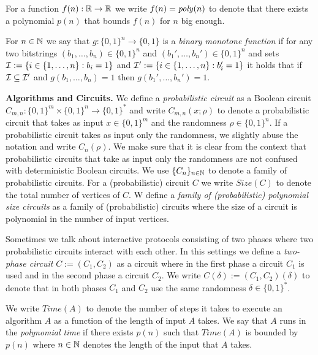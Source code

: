 For a function $f(n): \mathbb{R} \rightarrow \mathbb{R}$ we write $f(n) = \operatorname{\mathit{poly}}(n)$ to denote that there exists a polynomial $p(n)$ that
bounds $f(n)$ for $n$ big enough.

\begin{definition}
For $n \in \mathbb{N}$ we say that $g: \{0,1\}^n \rightarrow \{0,1\}$ is a \textit{binary monotone function}
if for any two bitstrings $(b_1, \dotsc, b_n) \in \{0,1\}^{n}$ and $(b_1', \dotsc, b_n') \in \{0,1\}^{n}$
and sets $\mathcal{I} := \{i \in \{1,\dotsc, n\}: b_i = 1\}$ and $\mathcal{I}' := \{i \in \{1,\dotsc, n\} : b_i' = 1\}$ it holds
that if $\mathcal{I} \subseteq \mathcal{I}'$ and $g(b_1, \dotsc, b_n) = 1$ then $g(b_1', \dotsc, b_n') = 1$.
\end{definition}

\textbf{Algorithms and Circuits.}
We define a \textit{probabilistic circuit} as a Boolean circuit $C_{m,n} : \{0,1\}^{m} \times \{0,1\}^{n} \rightarrow \{0,1\}^{*}$ and
write $C_{m,n}(x;\rho)$ to denote a probabilistic circuit that takes as input $x \in \{0,1\}^{m}$ and the randomness $\rho \in \{0,1\}^{n}$.
If a probabilistic circuit takes as input only the randomness, we slightly abuse the notation and write $C_{n}(\rho)$.
We make sure that it is clear from the context that probabilistic circuits that take as input only the randomness
are not confused with deterministic Boolean circuits. We use $\{C_n\}_{n \in \mathbb{N}}$ to denote a family of probabilistic circuits.
For a (probabilistic) circuit $C$ we write $\mathit{Size}(C)$ to denote the total number of vertices of $C$.
W define a \textit{family of (probabilistic) polynomial size circuits} as a family of (probabilistic) circuits where
the size of a circuit is polynomial in the number of input vertices.

Sometimes we talk about interactive protocols consisting of two phases where two probabilistic circuits interact with each other.
In this settings we define a \textit{two-phase circuit} $C := (C_1, C_2)$ as a circuit
where in the first phase a circuit $C_1$ is used and in the second phase a circuit $C_2$.
We write $C(\delta) := (C_1, C_2)(\delta)$ to denote that in both phases $C_1$ and $C_2$ use the same randomness $\delta \in \{0,1\}^{*}$.

We write $\mathit{Time}(A)$ to denote the number of steps it takes to execute
an algorithm $A$ as a function of the length of input $A$ takes.
We say that $A$ runs in the \textit{polynomial time} if there exists $p(n)$
such that $\mathit{Time}(A)$ is bounded by $p(n)$ where $n \in \mathbb{N}$ denotes the length of the input that $A$ takes.

